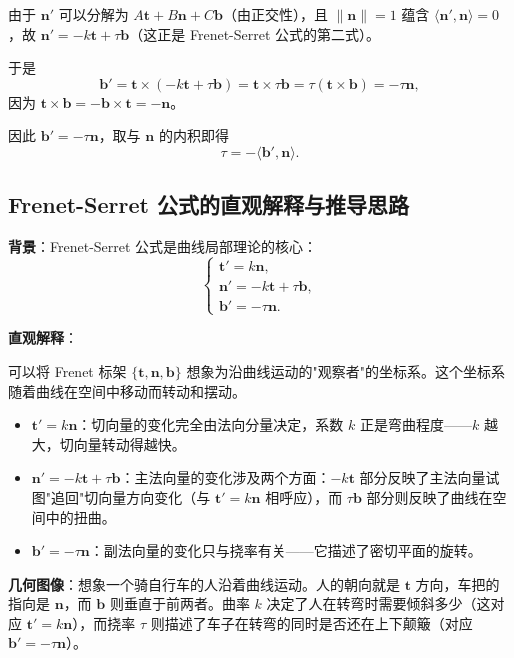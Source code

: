 由于 $\mathbf{n}'$ 可以分解为 $A\mathbf{t} + B\mathbf{n} + C\mathbf{b}$（由正交性），且 $\|\mathbf{n}\|=1$ 蕴含 $\langle \mathbf{n}', \mathbf{n} \rangle = 0$，故 $\mathbf{n}' = -k\mathbf{t} + \tau\mathbf{b}$（这正是 Frenet-Serret 公式的第二式）。

于是
\[
\mathbf{b}' = \mathbf{t} \times (-k\mathbf{t} + \tau\mathbf{b}) = \mathbf{t} \times \tau\mathbf{b} = \tau(\mathbf{t} \times \mathbf{b}) = -\tau\mathbf{n},
\]
因为 $\mathbf{t} \times \mathbf{b} = -\mathbf{b} \times \mathbf{t} = -\mathbf{n}$。

因此 $\mathbf{b}' = -\tau\mathbf{n}$，取与 $\mathbf{n}$ 的内积即得
\[
\tau = -\langle \mathbf{b}', \mathbf{n} \rangle.
\]

\subsection*{Frenet-Serret 公式的直观解释与推导思路}\label{sec:appendix-ch1-frenet-serret}

\textbf{背景}：Frenet-Serret 公式是曲线局部理论的核心：
\[
\begin{cases}
\mathbf{t}' = k \mathbf{n}, \\
\mathbf{n}' = -k \mathbf{t} + \tau \mathbf{b}, \\
\mathbf{b}' = -\tau \mathbf{n}.
\end{cases}
\]

\textbf{直观解释}：

可以将 Frenet 标架 $\{\mathbf{t}, \mathbf{n}, \mathbf{b}\}$ 想象为沿曲线运动的"观察者"的坐标系。这个坐标系随着曲线在空间中移动而转动和摆动。

\begin{itemize}
\item $\mathbf{t}' = k\mathbf{n}$：切向量的变化完全由法向分量决定，系数 $k$ 正是弯曲程度——$k$ 越大，切向量转动得越快。

\item $\mathbf{n}' = -k\mathbf{t} + \tau\mathbf{b}$：主法向量的变化涉及两个方面：$-k\mathbf{t}$ 部分反映了主法向量试图"追回"切向量方向变化（与 $\mathbf{t}' = k\mathbf{n}$ 相呼应），而 $\tau\mathbf{b}$ 部分则反映了曲线在空间中的扭曲。

\item $\mathbf{b}' = -\tau\mathbf{n}$：副法向量的变化只与挠率有关——它描述了密切平面的旋转。
\end{itemize}

\textbf{几何图像}：想象一个骑自行车的人沿着曲线运动。人的朝向就是 $\mathbf{t}$ 方向，车把的指向是 $\mathbf{n}$，而 $\mathbf{b}$ 则垂直于前两者。曲率 $k$ 决定了人在转弯时需要倾斜多少（这对应 $\mathbf{t}' = k\mathbf{n}$），而挠率 $\tau$ 则描述了车子在转弯的同时是否还在上下颠簸（对应 $\mathbf{b}' = -\tau\mathbf{n}$）。

